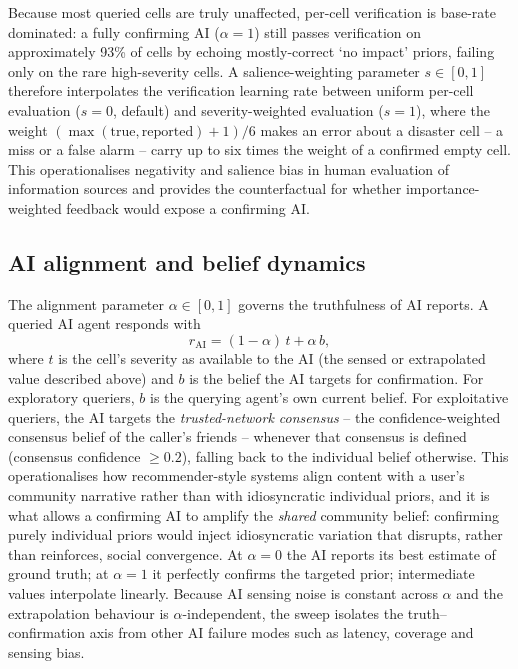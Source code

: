 \documentclass[sn-apacite]{sn-jnl}
\begin{document}
Because most queried cells are truly unaffected, per-cell verification is base-rate dominated: a fully confirming AI ($\alpha = 1$) still passes verification on approximately 93\% of cells by echoing mostly-correct `no impact' priors, failing only on the rare high-severity cells. A salience-weighting parameter $s \in [0, 1]$ therefore interpolates the verification learning rate between uniform per-cell evaluation ($s = 0$, default) and severity-weighted evaluation ($s = 1$), where the weight $(\max(\text{true}, \text{reported}) + 1)/6$ makes an error about a disaster cell -- a miss or a false alarm -- carry up to six times the weight of a confirmed empty cell. This operationalises negativity and salience bias in human evaluation of information sources and provides the counterfactual for whether importance-weighted feedback would expose a confirming AI.

\subsection{AI alignment and belief dynamics}\label{sec:alignment}

The alignment parameter $\alpha \in [0, 1]$ governs the truthfulness of AI reports. A queried AI agent responds with
\begin{equation}
r_{\text{AI}} = (1 - \alpha)\, t + \alpha\, b,
\label{eq:alignment}
\end{equation}
where $t$ is the cell's severity as available to the AI (the sensed or extrapolated value described above) and $b$ is the belief the AI targets for confirmation. For exploratory queriers, $b$ is the querying agent's own current belief. For exploitative queriers, the AI targets the \emph{trusted-network consensus} -- the confidence-weighted consensus belief of the caller's friends -- whenever that consensus is defined (consensus confidence $\geq 0.2$), falling back to the individual belief otherwise. This operationalises how recommender-style systems align content with a user's community narrative rather than with idiosyncratic individual priors, and it is what allows a confirming AI to amplify the \emph{shared} community belief: confirming purely individual priors would inject idiosyncratic variation that disrupts, rather than reinforces, social convergence. At $\alpha = 0$ the AI reports its best estimate of ground truth; at $\alpha = 1$ it perfectly confirms the targeted prior; intermediate values interpolate linearly. Because AI sensing noise is constant across $\alpha$ and the extrapolation behaviour is $\alpha$-independent, the sweep isolates the truth--confirmation axis from other AI failure modes such as latency, coverage and sensing bias.
\end{document}
